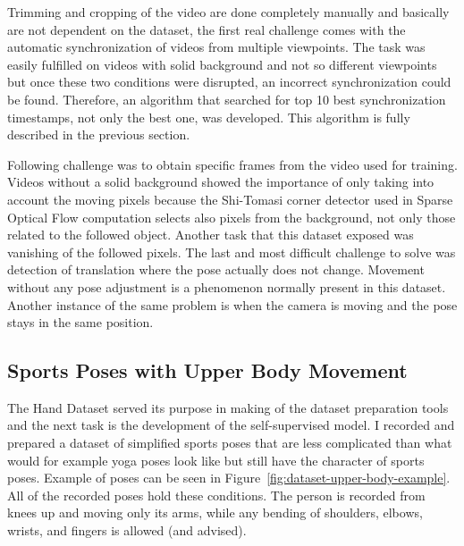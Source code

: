 Trimming and cropping of the video are done completely manually and basically are not dependent on the dataset, the first real challenge comes with the automatic synchronization of videos from multiple viewpoints. The task was easily fulfilled on videos with solid background and not so different viewpoints but once these two conditions were disrupted, an incorrect synchronization could be found. Therefore, an algorithm that searched for top 10 best synchronization timestamps, not only the best one, was developed. This algorithm is fully described in the previous section.

Following challenge was to obtain specific frames from the video used for training. Videos without a solid background showed the importance of only taking into account the moving pixels because the Shi-Tomasi corner detector used in Sparse Optical Flow computation selects also pixels from the background, not only those related to the followed object. Another task that this dataset exposed was vanishing of the followed pixels. The last and most difficult challenge to solve was detection of translation where the pose actually does not change. Movement without any pose adjustment is a phenomenon normally present in this dataset. Another instance of the same problem is when the camera is moving and the pose stays in the same position.

\subsection{\label{sec:dataset-upper-body}Sports Poses with Upper Body Movement}

The Hand Dataset served its purpose in making of the dataset preparation tools and the next task is the development of the self-supervised model. I recorded and prepared a dataset of simplified sports poses that are less complicated than what would for example yoga poses look like but still have the character of sports poses. Example of poses can be seen in Figure~\ref{fig:dataset-upper-body-example}. All of the recorded poses hold these conditions. The person is recorded from knees up and moving only its arms, while any bending of shoulders, elbows, wrists, and fingers is allowed (and advised).

